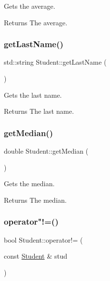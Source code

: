 Gets the average. 

\begin{DoxyReturn}{Returns}
The average. 
\end{DoxyReturn}
\mbox{\label{class_student_a020b2a94967c9e5868ccc98e2fe6258b}} 
\subsubsection{\texorpdfstring{get\+Last\+Name()}{getLastName()}}
{\footnotesize\ttfamily std\+::string Student\+::get\+Last\+Name (\begin{DoxyParamCaption}{ }\end{DoxyParamCaption})\hspace{0.3cm}{\ttfamily [inline]}}



Gets the last name. 

\begin{DoxyReturn}{Returns}
The last name. 
\end{DoxyReturn}
\mbox{\label{class_student_aeb6a5deff034e8e9c2e3b066fdae1a7b}} 
\subsubsection{\texorpdfstring{get\+Median()}{getMedian()}}
{\footnotesize\ttfamily double Student\+::get\+Median (\begin{DoxyParamCaption}{ }\end{DoxyParamCaption})\hspace{0.3cm}{\ttfamily [inline]}}



Gets the median. 

\begin{DoxyReturn}{Returns}
The median. 
\end{DoxyReturn}
\mbox{\label{class_student_a58c13f22a8458e3ed6cf0afceebc3e31}} 
\subsubsection{\texorpdfstring{operator"!=()}{operator!=()}}
{\footnotesize\ttfamily bool Student\+::operator!= (\begin{DoxyParamCaption}\item[{const \mbox{\hyperlink{class_student}{Student}} \&}]{stud }\end{DoxyParamCaption})\hspace{0.3cm}{\ttfamily [inline]}}



